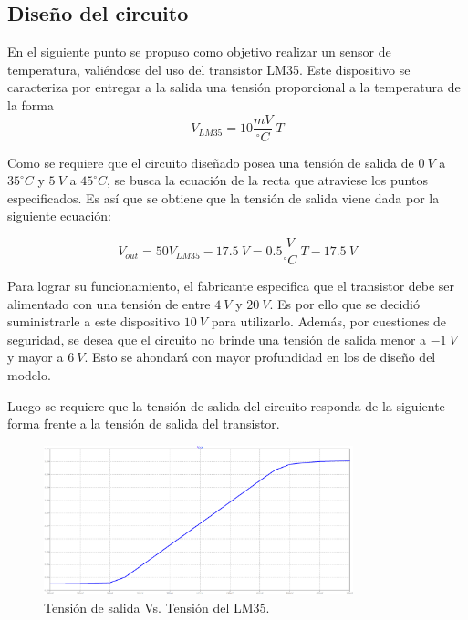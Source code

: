 \documentclass[a4paper]{article}
\begin{document}
\subsection{Diseño del circuito}

En el siguiente punto se propuso como objetivo realizar un sensor de temperatura, valiéndose del uso del transistor LM35. Este dispositivo se caracteriza por entregar a la salida una tensión proporcional a la temperatura de la forma
\[
	V_{LM35} = 10 \frac{mV}{^{\circ}C} \ T
\]

Como se requiere que el circuito diseñado posea una tensión de salida de $ 0 \ V $ a $ 35 ^{\circ}C $ y $ 5 \ V $ a $ 45 ^{\circ}C $, se busca la ecuación de la recta que atraviese los puntos especificados. Es así que se obtiene que la tensión de salida viene dada por la siguiente ecuación:

\begin{equation}
	V_{out} = 50V_{LM35} - 17.5 \ V =  0.5 \frac{V}{^{\circ}C} \ T - 17.5 \ V
	\label{equ:sistema}
\end{equation}

Para lograr su funcionamiento, el fabricante especifica que el transistor debe ser alimentado con una tensión de entre $4 \ V$ y $20 \ V$. Es por ello que se decidió suministrarle a este dispositivo $10 \ V$ para utilizarlo. Además, por cuestiones de seguridad, se desea que el circuito no brinde una tensión de salida menor a $-1 \ V$ y mayor a $6 \ V$. Esto se ahondará con mayor profundidad en los de diseño del modelo.

Luego se requiere que la tensión de salida del circuito responda de la siguiente forma frente a la tensión de salida del transistor.

\begin{figure}[H]
	\centering
	\includegraphics[width=0.8\textwidth]{Ejercicio6/Imagenes/SalidaVsVLM35.png}
\caption{Tensión de salida Vs. Tensión del LM35.}
	\label{fig:vout}
\end{figure}
\end{document}
